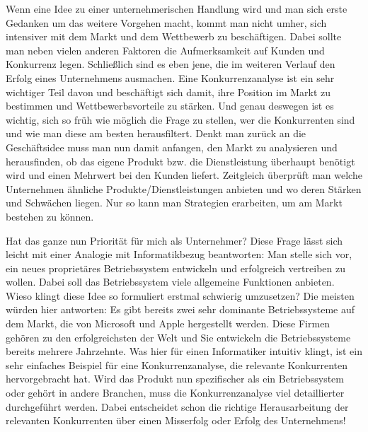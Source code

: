 \begin{refsection}
  
  Wenn eine Idee zu einer unternehmerischen Handlung wird und man sich erste Gedanken um das weitere Vorgehen macht, kommt man nicht umher, sich intensiver mit dem Markt und dem Wettbewerb zu beschäftigen. Dabei sollte man neben vielen anderen Faktoren die Aufmerksamkeit auf Kunden und Konkurrenz legen. Schlie\ss{}lich sind es eben jene, die im weiteren Verlauf den Erfolg eines Unternehmens ausmachen. Eine Konkurrenzanalyse ist ein sehr wichtiger Teil davon und beschäftigt sich damit, ihre Position im Markt zu bestimmen und Wettbewerbsvorteile zu stärken. Und genau deswegen ist es wichtig, sich so früh wie möglich die Frage zu stellen, wer die Konkurrenten sind und wie man diese am besten herausfiltert. Denkt man zurück an die Geschäftsidee muss man nun damit anfangen, den Markt zu analysieren und herausfinden, ob das eigene Produkt bzw. die Dienstleistung überhaupt benötigt wird und einen Mehrwert bei den Kunden liefert. Zeitgleich überprüft man welche Unternehmen ähnliche Produkte/Dienstleistungen anbieten und wo deren Stärken und Schwächen liegen. Nur so kann man Strategien erarbeiten, um am Markt bestehen zu können.

  Hat das ganze nun Priorität für mich als Unternehmer? Diese Frage lässt sich leicht mit einer Analogie mit Informatikbezug beantworten: Man stelle sich vor, ein neues proprietäres Betriebssystem entwickeln und erfolgreich vertreiben zu wollen. Dabei soll das Betriebssystem viele allgemeine Funktionen anbieten. Wieso klingt diese Idee so formuliert erstmal schwierig umzusetzen? Die meisten würden hier antworten: Es gibt bereits zwei sehr dominante Betriebssysteme auf dem Markt, die von Microsoft und Apple hergestellt werden. Diese Firmen gehören zu den erfolgreichsten der Welt und Sie entwickeln die Betriebssysteme bereits mehrere Jahrzehnte. Was hier für einen Informatiker intuitiv klingt, ist ein sehr einfaches Beispiel für eine Konkurrenzanalyse, die relevante Konkurrenten hervorgebracht hat. Wird das Produkt nun spezifischer als ein Betriebssystem oder gehört in andere Branchen, muss die Konkurrenzanalyse viel detaillierter durchgeführt werden. Dabei entscheidet schon die richtige Herausarbeitung der relevanten Konkurrenten über einen Misserfolg oder Erfolg des Unternehmens!


  \clearpage
  \printbibliography[heading=subsubbibliography]
\end{refsection}
\clearpage
